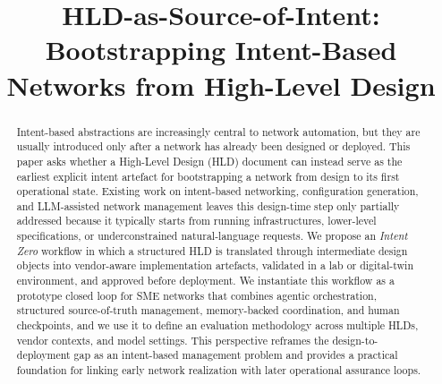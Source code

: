 \documentclass[conference]{IEEEtran}
\begin{document}

\title{HLD-as-Source-of-Intent: Bootstrapping Intent-Based Networks from High-Level Design}

\author{
\and
{}
}

\maketitle

\begin{abstract}
Intent-based abstractions are increasingly central to network automation, but they are usually introduced only after a network has already been designed or deployed. This paper asks whether a High-Level Design (HLD) document can instead serve as the earliest explicit intent artefact for bootstrapping a network from design to its first operational state. Existing work on intent-based networking, configuration generation, and LLM-assisted network management leaves this design-time step only partially addressed because it typically starts from running infrastructures, lower-level specifications, or underconstrained natural-language requests. We propose an \emph{Intent Zero} workflow in which a structured HLD is translated through intermediate design objects into vendor-aware implementation artefacts, validated in a lab or digital-twin environment, and approved before deployment. We instantiate this workflow as a prototype closed loop for SME networks that combines agentic orchestration, structured source-of-truth management, memory-backed coordination, and human checkpoints, and we use it to define an evaluation methodology across multiple HLDs, vendor contexts, and model settings. This perspective reframes the design-to-deployment gap as an intent-based management problem and provides a practical foundation for linking early network realization with later operational assurance loops.
\end{abstract}
\end{document}
